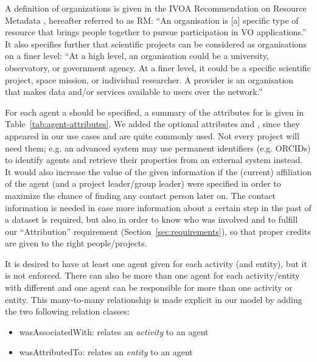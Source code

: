 A definition of organizations is given in the 
IVOA Recommendation on Resource Metadata \citep{std:ResourceMeta}, hereafter 
referred to as RM: ``An organisation is [a] specific type of resource that 
brings people together to pursue participation in VO applications.''
It also specifies further that scientific projects can be considered 
as organisations on a finer level:
``At a high level, an organisation could be a university, observatory, or government
agency. At a finer level, it could be a specific scientific project, space mission,
or individual researcher. A provider is an organisation that makes data and/or services
available to users over the network.''

For each agent a  should be specified, a summary of the attributes for  is given in Table~\ref{tab:agent-attributes}.
We added the optional attributes  and , since they appeared in our use cases and are quite commonly used.
Not every project will need them; e.g. an advanced system may use permanent identifiers (e.g. ORCIDs) to identify agents and retrieve their properties from an external system instead.
It would also increase the value of the given
information if the (current) affiliation of the agent (and a project leader/group
leader) were specified in order to maximize the chance of finding any contact 
person later on. 
The contact information is needed in case more information about a certain step in the past of a dataset is required,
but also in order
to know who was involved and to fulfill our ``Attribution'' requirement 
(Section~\ref{sec:requirements}), so that proper credits are given to the 
right people/projects. 



It is desired to have at least one agent given for each activity (and entity), but it
is not enforced.
There can also be more than one agent for each activity/entity with different  
and one agent can be responsible for more than one activity or entity. This 
many-to-many relationship is made explicit in our model by adding the two
following relation classes:

\begin{itemize}
\item wasAssociatedWith: relates an \emph{activity} to an agent
\item wasAttributedTo: relates an \emph{entity} to an agent
\end{itemize}

